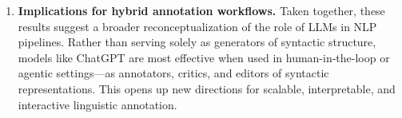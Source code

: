 \begin{enumerate}
    \item \textbf{Implications for hybrid annotation workflows.} Taken together, these results suggest a broader reconceptualization of the role of LLMs in NLP pipelines. Rather than serving solely as generators of syntactic structure, models like ChatGPT are most effective when used in human-in-the-loop or agentic settings—as annotators, critics, and editors of syntactic representations. This opens up new directions for scalable, interpretable, and interactive linguistic annotation.
\end{enumerate}